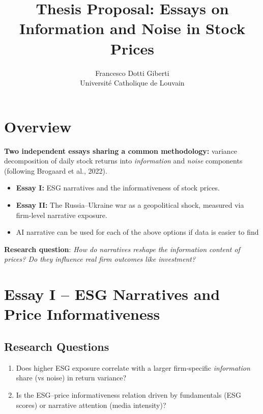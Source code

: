 \documentclass[12pt]{article}
\begin{document}
\title{\textbf{Thesis Proposal: Essays on Information and Noise in Stock Prices}}
\author{Francesco Dotti Giberti \\ Université Catholique de Louvain}
\maketitle

\vspace{-1em}
\section*{Overview}

\noindent
\textbf{Two independent essays sharing a common methodology:} variance decomposition of daily stock returns into \emph{information} and \emph{noise} components (following Brogaard et al., 2022). 

\begin{itemize}[leftmargin=*]
  \item \textbf{Essay I:} ESG narratives and the informativeness of stock prices.
  \item \textbf{Essay II:} The Russia--Ukraine war as a geopolitical shock, measured via firm-level narrative exposure.
  \item AI narrative can be used for each of the above options if data is easier to find
\end{itemize}

\noindent
\textbf{Research question}: \emph{How do narratives reshape the information content of prices? Do they influence real firm outcomes like investment?}

\vspace{0.5em}
\section*{Essay I -- ESG Narratives and Price Informativeness}

\subsection*{Research Questions}
\begin{enumerate}[leftmargin=*,label={\arabic*.}]
  \item Does higher ESG exposure correlate with a larger firm-specific \emph{information} share (vs noise) in return variance?
  \item Is the ESG--price informativeness relation driven by fundamentals (ESG scores) or narrative attention (media intensity)?
\end{enumerate}
\end{document}

